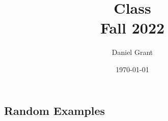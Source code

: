 \documentclass{report}
\title{\Huge{Class}\\Fall 2022}
\author{\huge{Daniel Grant}}
\date{\today}
\begin{document}
\maketitle
\newpage%
\tableofcontents
\pagebreak

\chapter{}
\section{Random Examples}
\end{document}
